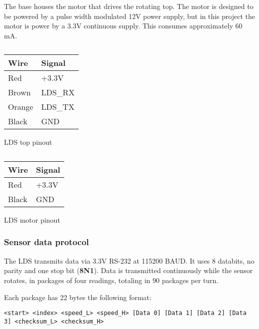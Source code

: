 \documentclass[Main]{subfiles}
\begin{document}
		The base houses the motor that drives the rotating top.
		The motor is designed to be powered by a pulse width modulated 12V power supply, but in this project the motor is power by a 3.3V continuous supply.
		This consumes approximately 60 mA.

		\begin{table}[h]
			\begin{subtable}[b]{0.5\linewidth}
				\centering
					\begin{tabular}{|l|l|}
					\hline
					{\bf Wire} & {\bf Signal} \\ \hline
					Red        & +3.3V        \\ \hline
					Brown      & LDS\_RX      \\ \hline
					Orange     & LDS\_TX      \\ \hline
					Black      & GND          \\ \hline
				\end{tabular}
				\caption{LDS top pinout}
				\label{tab:lds_top}
			\end{subtable}
			\begin{subtable}[b]{0.5\linewidth}
				\centering
				\begin{tabular}{|l|l|}
					\hline
					{\bf Wire} & {\bf Signal} \\ \hline
					Red        & +3.3V        \\ \hline
					Black      & GND          \\ \hline
				\end{tabular}
				\caption{LDS motor pinout}
				\label{tab:lds_motor}
			\end{subtable}
			\caption{}
		\end{table}


		\subsubsection{Sensor data protocol} %
		\label{ssub:sensor_communication_protocol}
			The LDS transmits data via 3.3V RS-232 at 115200 BAUD.
			It uses 8 databits, no parity and one stop bit (\textbf{8N1}).
			Data is transmitted continuously while the sensor rotates, in packages of four readings, totaling in 90 packages per turn.

			Each package has 22 bytes the following format:

			{\footnotesize\texttt{<start> <index> <speed\_L> <speed\_H> [Data 0] [Data 1] [Data 2] [Data 3] <checksum\_L> <checksum\_H>}}
\end{document}
